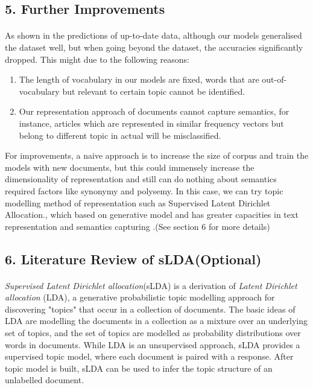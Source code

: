 \documentclass{article}
\begin{document}
 \subsection*{5. Further Improvements}
 \paragraph{}
 As shown in the predictions of up-to-date data, although our models generalised the dataset well, but when going beyond the dataset, the accuracies significantly dropped. This might due to the following reasons: 
 \begin{enumerate}
 	\item The length of vocabulary in our models are fixed, words that are out-of-vocabulary but relevant to certain topic cannot be identified.
 	\item Our representation approach of documents cannot capture semantics, for instance,  articles which are represented in similar frequency vectors but belong to different topic in actual will be misclassified.
 \end{enumerate}
For improvements, a naive approach is to increase the size of corpus and train the models with new documents, but this could immensely increase the dimensionality of representation and still can do nothing about semantics required factors like synonymy and polysemy. 
 In this case, we can try topic modelling method of representation such as Supervised Latent Dirichlet Allocation\cite{5}., which based on generative model and has greater capacities in text representation and semantics capturing .(See section 6 for more details)
 
 \subsection*{6. Literature Review of sLDA(Optional)}
 \paragraph{}
 \textit{Supervised Latent Dirichlet allocation}(sLDA) is a derivation of
 \textit{Latent Dirichlet allocation} (LDA), a generative probabilistic topic modelling approach for discovering "topics" that occur in a collection of documents. 
 The basic ideas of LDA are modelling the documents in a collection as a mixture over an underlying set of topics, and the set of topics are modelled as probability distributions over words in documents\cite{5}. While LDA is an unsupervised approach, sLDA provides a supervised topic model, where each document is paired with a response. After topic model is built, sLDA can be used to infer the topic structure of an unlabelled document\cite{6}.
\end{document}

